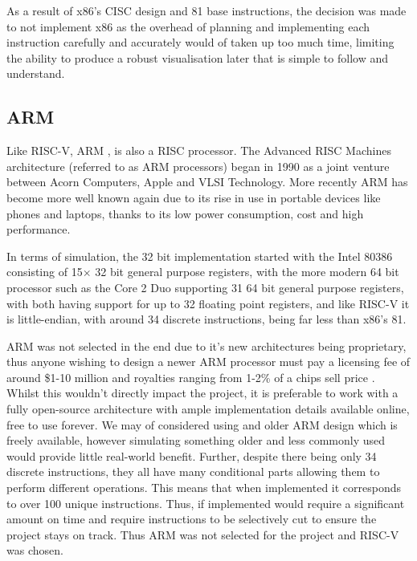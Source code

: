 As a result of x86's CISC design and 81 base instructions, the decision was made to not implement x86 as the overhead of planning and implementing each instruction carefully and accurately would of taken up too much time, limiting the ability to produce a robust visualisation later that is simple to follow and understand.
\subsection{ARM}
Like RISC-V, ARM \cite{armltd_2023_defining}, is also a \ac{RISC} processor. The Advanced RISC Machines architecture (referred to as ARM processors) began in 1990 as a joint venture between Acorn Computers, Apple and VLSI Technology. More recently ARM has become more well known again due to its rise in use in portable devices like phones and laptops, thanks to its low power consumption, cost and high performance. \cite{schmitt_2021_is}

In terms of simulation, the 32 bit implementation started with the Intel 80386 \cite{intel_1998_intel386} consisting of 15$\times$ 32 bit general purpose registers, with the more modern 64 bit  processor such as the Core 2 Duo \cite{intel_2007_intel} supporting 31 64 bit general purpose registers, with both having support for up to 32 floating point registers, and like RISC-V it is little-endian, with around 34 discrete instructions, being far less than x86's 81.

ARM was not selected in the end due to it's new architectures being proprietary, thus anyone wishing to design a newer ARM processor must pay a licensing fee of around \$1-10 million and royalties ranging from 1-2\% of a chips sell price \cite{strategyzerag_2014_arm}. Whilst this wouldn't directly impact the project, it is preferable to work with a fully open-source architecture with ample implementation details available online, free to use forever. We may of considered using and older ARM design which is freely available, however simulating something older and less commonly used would provide little real-world benefit. Further, despite there being only 34 discrete instructions, they all have many conditional parts allowing them to perform different operations. This means that when implemented it corresponds to over 100 unique instructions. Thus, if implemented would require a significant amount on time and require instructions to be selectively cut to ensure the project stays on track. Thus ARM was not selected for the project and RISC-V was chosen.

